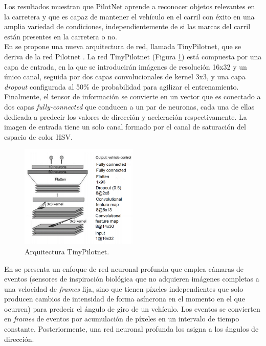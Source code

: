 Los resultados muestran que PilotNet aprende a reconocer objetos relevantes en la carretera y que es capaz de mantener el vehículo en el carril con éxito en una amplia variedad de condiciones, independientemente de si las marcas del carril están presentes en la carretera o no.\\


En \cite{self-driving} se propone una nueva arquitectura de red, llamada TinyPilotnet, que se deriva de la red Pilotnet \cite{end2end} \cite{explaining-end2end}. La red TinyPilotnet (Figura \ref{fig.tinypilotnet}) está compuesta por una capa de entrada, en la que se introducirán imágenes de resolución 16x32 y un único canal, seguida por dos capas convolucionales de kernel 3x3, y una capa \textit{dropout} configurada al 50\% de probabilidad para agilizar el entrenamiento. Finalmente, el tensor de información se convierte en un vector que es conectado a dos capas \textit{fully-connected} que conducen a un par de neuronas, cada una de ellas dedicada a predecir los valores de dirección y aceleración respectivamente. La imagen de entrada tiene un solo canal formado por el canal de saturación del espacio de color HSV.\\

\begin{figure}
\begin{center}
	\includegraphics[width=0.5\textwidth]{figures/Estado_arte/tinypilotnet.png}
   \caption{Arquitectura TinyPilotnet.}
	\label{fig.tinypilotnet}
\end{center}
\end{figure}

En \cite{event} se presenta un enfoque de red neuronal profunda que emplea cámaras de eventos (sensores de inspiración biológica que no adquieren imágenes completas a una velocidad de \textit{frames} fija, sino que tienen píxeles independientes que solo producen cambios de intensidad de forma asíncrona en el momento en el que ocurren) para predecir el ángulo de giro de un vehículo. Los eventos se convierten en \textit{frames} de eventos por acumulación de píxeles en un intervalo de tiempo constante. Posteriormente, una red neuronal profunda los asigna a los ángulos de dirección.\\

